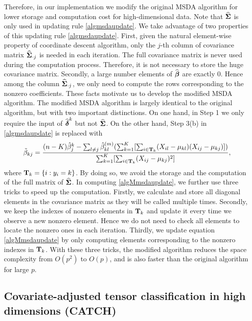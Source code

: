 Therefore, in our implementation we modify the original MSDA algorithm for lower storage and computation cost for high-dimensional data. Note that $\widehat{\boldsymbol{\Sigma}}$ is only used in updating rule \eqref{algmsdaupdate}. We take advantage of two properties of this  updating rule \eqref{algmsdaupdate}. First, given the natural element-wise property of coordinate descent algorithm, only the $j$-th column of covariance matrix $\widehat{\boldsymbol{\Sigma}}_{\cdot j}$ is needed in each iteration. The full covariance matrix is never used during the computation process. Therefore, it is not necessary to store the huge covariance matrix. Secondly, a large number elements of $\widehat{\boldsymbol{\beta}}$ are exactly 0. Hence among the column $\widehat{\boldsymbol{\Sigma}}_{\cdot j}$, we only need to compute the rows corresponding to the nonzero coefficients.
These facts motivate us to develop the modified MSDA algorithm. The modified MSDA algorithm is largely identical to the original algorithm, but with two important distinctions. On one hand, in Step 1 we only require the input of $\widehat{\boldsymbol{\delta}}^k$ but not $\widehat{\boldsymbol{\Sigma}}$. On the other hand, Step 3(b) in \eqref{algmsdaupdate} is replaced with
\begin{equation}\label{algMmsdaupdate}
\tilde{\beta}_{kj}=\frac{(n-K)\hat\beta_j^k-\sum_{l\neq j}\hat\beta_{kl}^{(m)}(\sum_{k=1}^K[\sum_{i\in\mathbf{T}_k}(X_{il}-\mu_{kl})(X_{ij}-\mu_{kj})])}{\sum_{k=1}^K[\sum_{i\in\mathbf{T}_k}(X_{ij}-\mu_{kj})^2]},
\end{equation}
where $\mathbf{T}_k=\{i:y_i=k\}$. By doing so, we avoid the storage and the computation of the full matrix of $\widehat{\boldsymbol{\Sigma}}$. In computing \eqref{algMmsdaupdate}, we further use three tricks to speed up the computation. Firstly, we calculate and store all diagonal elements in the covariance matrix as they will be called multiple times.
Secondly, we keep the indexes of nonzero elements in $\mathbf{T}_k$ and update it every time we observe a new nonzero element. Hence we do not need to check all elements to locate the nonzero ones in each iteration. Thirdly, we update equation \eqref{algMmsdaupdate} by only computing elements corresponding to the nonzero indexes in $\mathbf{T}_k$. With these three tricks, the modified algorithm reduces the space complexity from $O(p^2)$ to $O(p)$, and is also faster than the original algorithm for large $p$.






\subsection{Covariate-adjusted tensor classification in high dimensions (CATCH)}\label{catchmodel}



